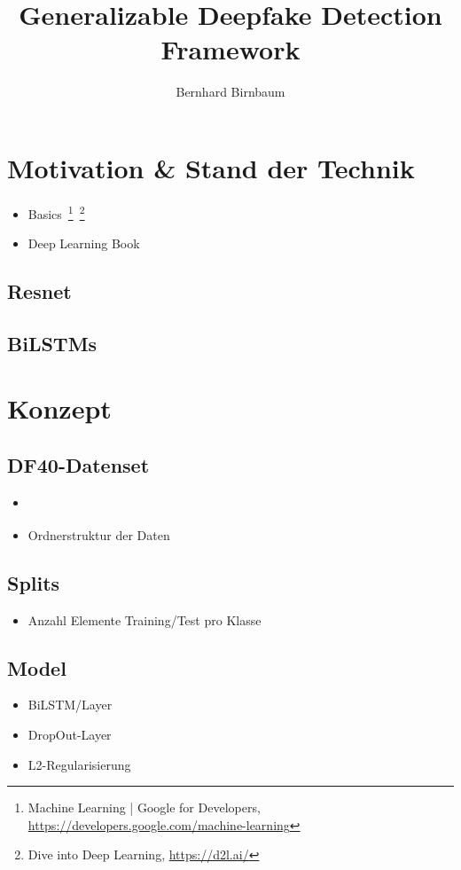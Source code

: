 \documentclass{article}
\title{Generalizable Deepfake Detection Framework}
\author{Bernhard Birnbaum}
\begin{document}
    \maketitle

    \section{Motivation \& Stand der Technik}
    \begin{itemize}
        \item Basics~\footnote{Machine Learning | Google for Developers, \url{https://developers.google.com/machine-learning}}~\footnote{Dive into Deep Learning, \url{https://d2l.ai/}}
        \item Deep Learning Book~\cite{deeplearningbook}
    \end{itemize}
    \subsection{Resnet}
    \subsection{BiLSTMs}
    \section{Konzept}
    \subsection{DF40-Datenset}
    \begin{itemize}
        \item \cite{yan2024df40}
        \item Ordnerstruktur der Daten
    \end{itemize}
    \subsection{Splits}
    \begin{itemize}
        \item Anzahl Elemente Training/Test pro Klasse
    \end{itemize}
    \subsection{Model}
    \begin{itemize}
        \item BiLSTM/Layer
        \item DropOut-Layer
        \item L2-Regularisierung
    \end{itemize}
\end{document}
